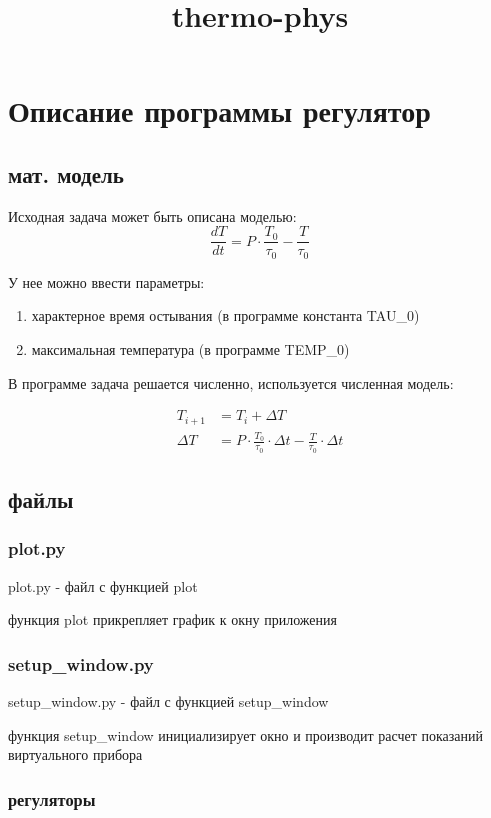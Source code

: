 \documentclass{article}
\title{thermo-phys}
\begin{document}
\section{Описание программы регулятор}
\subsection{мат. модель}

Исходная задача может быть описана моделью:
\begin{equation}
    \frac{dT}{dt} = P \cdot \frac{T_0}{\tau_0} - \frac{T}{\tau_0}
\end{equation}

У нее можно ввести параметры:
\begin{enumerate}
    \item характерное время остывания (в программе константа TAU\_0)
    \item максимальная температура (в программе TEMP\_0) 
\end{enumerate}

В программе задача решается численно, используется численная модель:

\begin{align}
    T_{i+1} &= T_i + \Delta T \\
    \Delta T &= P \cdot \frac{T_0}{\tau_0} \cdot \Delta t - \frac{T}{\tau_0} \cdot \Delta t
\end{align}

\subsection{файлы}

\subsubsection{plot.py}
plot.py - файл с функцией plot

функция plot прикрепляет график к окну приложения

\subsubsection{setup\_window.py}
setup\_window.py - файл с функцией setup\_window

функция setup\_window инициализирует окно и производит расчет показаний виртуального прибора

\subsubsection{регуляторы}
\end{document}
